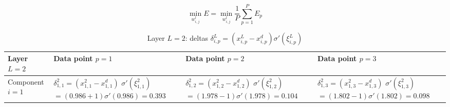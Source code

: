 \newpage

\begin{equation}
    \min_{w_{i, j}^l}{E} = \min_{w_{i, j}^l}{\frac{1}{P} \sum_{p=1}^P{E_p}}
\end{equation}

\begin{table}[h!]
    \centering
    \begin{tabular}{|m{2.25cm}|p{3.75cm}|p{3.75cm}|p{3.75cm}|}
        \hline
        Layer $L = 2$ &
        Data point $p = 1$ &
        Data point $p = 2$ &
        Data point $p = 3$ \\
        \hline
        \centering Component $i = 1$ &

        $\delta_{1, 1}^2 = ( x_{1, 1}^2 - x_{1, 1}^d )$
        $\sigma'(\xi_{1, 1}^2)$
        $= (0.986 + 1) \sigma'(0.986) = 0.393$ &

        $\delta_{1, 2}^2 = ( x_{1, 2}^2 - x_{1, 2}^d )$
        $\sigma'(\xi_{1, 2}^2)$
        $= (1.978 - 1) \sigma'(1.978) = 0.104$ &

        $\delta_{1, 3}^2 = ( x_{1, 3}^2 - x_{1, 3}^d )$
        $\sigma'(\xi_{1, 3}^2)$
        $= (1.802 - 1) \sigma'(1.802) = 0.098$ \\
        \hline
    \end{tabular}
\caption{Layer $L = 2$: deltas $\delta_{i, p}^L = ( x_{i, p}^L - x_{i, p}^d ) \sigma'(\xi_{i, p}^L)$}
\label{table:layer2-delta}
\end{table}

